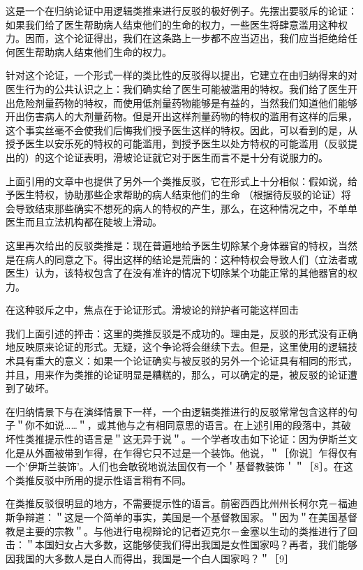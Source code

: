 这是一个在归纳论证中用逻辑类推来进行反驳的极好例子。先摆出要驳斥的论证：如果我们给了医生帮助病人结束他们的生命的权力，一些医生将肆意滥用这种权力。因而，这个论证得出，我们在这条路上一步都不应当迈出，我们应当拒绝给任何医生帮助病人结束他们生命的权力。

针对这个论证，一个形式一样的类比性的反驳得以提出，它建立在由归纳得来的对医生行为的公共认识之上：我们确实给了医生可能被滥用的特权。我们给了医生开出危险剂量药物的特权，而使用低剂量药物能够是有益的，当然我们知道他们能够开出伤害病人的大剂量药物。但是开出这样剂量药物的特权的滥用有这样的后果，这个事实丝毫不会使我们后悔我们授予医生这样的特权。因此，可以看到的是，从授予医生以安乐死的特权的可能滥用，到授予医生以处方特权的可能滥用（反驳提出的）的这个论证表明，滑坡论证就它对于医生而言不是十分有说服力的。

上面引用的文章中也提供了另外一个类推反驳，它在形式上十分相似：假如说，给予医生特权，协助那些企求帮助的病人结束他们的生命 （根据待反驳的论证）将会导致结束那些确实不想死的病人的特权的产生，那么，在这种情况之中，不单单医生而且立法机构都在陡坡上滑动。

这里再次给出的反驳类推是：现在普遍地给予医生切除某个身体器官的特权，当然是在病人的同意之下。得出这样的结论是荒唐的：这种特权会导致人们（立法者或医生）认为，该特权包含了在没有准许的情况下切除某个功能正常的其他器官的权力。

在这种驳斥之中，焦点在于论证形式。滑坡论的辩护者可能这样回击

我们上面引述的抨击：这里的类推反驳是不成功的。理由是，反驳的形式没有正确地反映原来论证的形式。无疑，这个争论将会继续下去。但是，这里使用的逻辑技术具有重大的意义：如果一个论证确实与被反驳的另外一个论证具有相同的形式，并且，用来作为类推的论证明显是糟糕的，那么，可以确定的是，被反驳的论证遭到了破坏。

在归纳情景下与在演绎情景下一样，一个由逻辑类推进行的反驳常常包含这样的句子＂你不如说……＂，或其他与之有相同意思的语言。在上述引用的段落中，其破坏性类推提示性的语言是＂这无异于说＂。一个学者攻击如下论证：因为伊斯兰文化是从外面被带到乍得，在乍得它只不过是一个装饰。他说，＂［你说］乍得仅有一个'伊斯兰装饰'。人们也会敏锐地说法国仅有一个＇基督教装饰＇＂［8］。在这个类推反驳中所用的提示性语言稍有不同。

在类推反驳很明显的地方，不需要提示性的语言。前密西西比州州长柯尔克－福迪斯争辩道：＂这是一个简单的事实，美国是一个基督教国家。＂因为＂在美国基督教是主要的宗教＂。与他进行电视辩论的记者迈克尔－金塞以生动的类推进行了回击：＂本国妇女占大多数，这能够使我们得出我国是女性国家吗？再者，我们能够因我国的大多数人是白人而得出，我国是一个白人国家吗？＂［9］ 